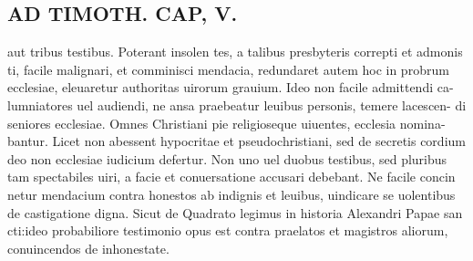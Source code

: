 \documentclass{article}
\begin{document}
\begin{pages}
\section*{AD TIMOTH. CAP, V. }
\marginpar{[ p.525 ]}\pstart aut tribus testibus. Poterant insolen tes, a talibus presbyteris correpti et admonis ti, facile malignari, et comminisci mendacia, redundaret autem hoc in probrum ecclesiae, eleuaretur authoritas uirorum grauium. Ideo non facile admittendi ca- lumniatores uel audiendi, ne ansa praebeatur leuibus personis, temere lacescen- di seniores ecclesiae. Omnes Christiani pie religioseque uiuentes, ecclesia nomina- bantur. Licet non abessent hypocritae et pseudochristiani, sed de secretis cordium deo non ecclesiae iudicium defertur. Non uno uel duobus testibus, sed pluribus tam spectabiles uiri, a facie et conuersatione accusari debebant. Ne facile concin netur mendacium contra honestos ab indignis et leuibus, uindicare se uolentibus de castigatione digna. Sicut de Quadrato legimus in historia Alexandri Papae san cti:ideo probabiliore testimonio opus est contra praelatos et magistros aliorum, conuincendos de inhonestate.  \pend
{}
{}

\end{pages}
\end{document}
